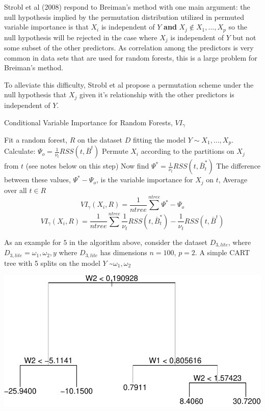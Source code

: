 \documentclass[12pt,twoside]{reedthesis}
\begin{document}
  Strobl et al (2008) respond to Breiman's method with one main argument:
  the null hypothesis implied by the permutation distribution utilized in
  permuted variable importance is that \(X_i\) is independent of \(Y\)
  \textbf{and} \({X_j \notin X_1,...,X_p}\) so the null hypothesis will be
  rejected in the case where \(X_j\) is independent of \(Y\) but not some
  subset of the other predictors. As correlation among the predictors is
  very common in data sets that are used for random forests, this is a
  large problem for Breiman's method.
  
  To alleviate this difficulty, Strobl et al propose a permutation scheme
  under the null hypothesis that \(X_j\) given it's relationship with the
  other predictors is independent of \(Y\).
  
  \begin{algorithm}
  \caption{Conditional Variable Importance for Random Forests, $VI_{\gamma}$}
  \label{strobl}
  \begin{algorithmic}[1]
  \State Fit a random forest, $R$ on the dataset $D$ fitting the model $Y \sim X_1,...,X_p$.
  \State Calculate: $\Psi_o =  \frac 1 {\nu_t} RSS(t,\bar{B}^t)$
  \State Permute $X_i$ according to the partitions on $X_j$ from $t$ (see notes below on this step)
  Now find $\Psi^* =  \frac 1 {\nu_t} RSS(t,\bar{B}_t^*)$
  \State The difference between these values, $\Psi^* - \Psi_o$,  is the variable importance for $X_j$ on $t$,  
  \EndFor
  \State Average over all $t \in R$ 
   $$VI_{\gamma}(X_i,R) = \frac 1 {ntree} \sum^{ntree} \Psi^* - \Psi_o$$
   $$VI_{\gamma}(X_i, R) = \frac 1 {ntree} \sum^{ntree} \frac 1 {\nu_t} RSS(t,\bar{B}_t^*) - \frac 1 {\nu_t} RSS(t,\bar{B}^t)$$
  \EndFor
  \end{algorithmic}
  \end{algorithm}
  
  As an example for \(5\) in the algorithm above, consider the dataset
  \(D_{3,lite}\), where \(D_{3,lite} = {\omega_1, \omega_2, y}\) where
  \(D_{3,lite}\) has dimensions \(n = 100\), \(p = 2\). A simple CART tree
  with 5 splits on the model \(Y\) \textasciitilde{}\(\omega_1, \omega_2\)
  
  \begin{center}\includegraphics{Thesis_files/figure-latex/unnamed-chunk-2-1} \end{center}
  
\end{document}

